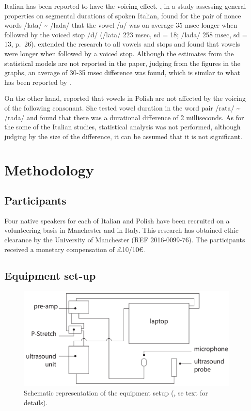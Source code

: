 \documentclass[authoryear, twocolumn]{elsarticle}
\newcommand{\euro}{€}
\begin{document}
Italian has been reported to have the voicing effect.
\citet{farnetani1986}, in a study assessing general properties on
segmental durations of spoken Italian, found for the pair of nonce words
/lata/ \textasciitilde{} /lada/ that the vowel /a/ was on average 35
msec longer when followed by the voiced stop /d/ (/lata/ 223 msec, sd =
18; /lada/ 258 msec, sd = 13, p.~26). \citet{esposito2002} extended the
research to all vowels and stops and found that vowels were longer when
followed by a voiced stop. Although the estimates from the statistical
models are not reported in the paper, judging from the figures in the
graphs, an average of 30-35 msec difference was found, which is similar
to what has been reported by \citet{farnetani1986}.

On the other hand, \citet{keating1984} reported that vowels in Polish
are not affected by the voicing of the following consonant. She tested
vowel duration in the word pair /rata/ \textasciitilde{} /rada/ and
found that there was a durational difference of 2 milliseconds. As for
the some of the Italian studies, statistical analysis was not performed,
although judging by the size of the difference, it can be assumed that
it is not significant.

\section{Methodology}\label{methodology}

\subsection{Participants}\label{participants}

Four native speakers for each of Italian and Polish have been recruited
on a volunteering basis in Manchester and in Italy. This research has
obtained ethic clearance by the University of Manchester (REF
2016-0099-76). The participants received a monetary compensation of
£10/10\euro{}.

\subsection{Equipment set-up}\label{equipment-set-up}

\begin{figure}
\centering
\includegraphics[width=1.00000\textwidth]{../../graphics/uti-setup.pdf}
\caption{Schematic representation of the equipment setup
(\citealt{articulate2011}, se text for details).\label{f:uti-setup}}
\end{figure}
\end{document}
